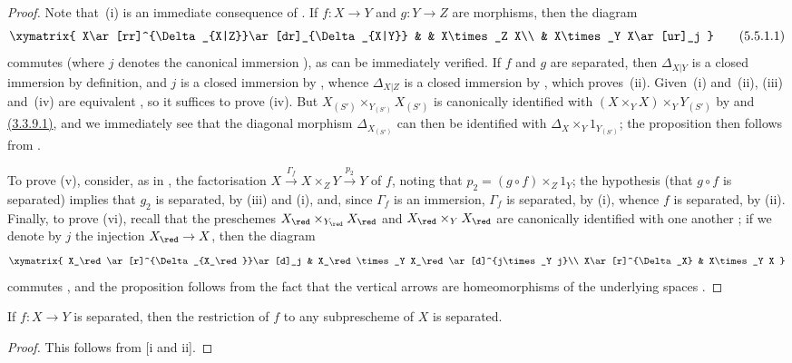 \begin{proof}
Note that~(i) is an immediate consequence of .
If $f:X\to Y$ and $g:Y\to Z$ are morphisms, then the diagram
\[
\label{I.5.5.1.1}
  \xymatrix{
    X\ar[rr]^{\Delta_{X|Z}}\ar[dr]_{\Delta_{X|Y}} & &
    X\times_Z X\\
    & X\times_Y X\ar[ur]_j
  }
  \tag{5.5.1.1}
\]
commutes (where $j$ denotes the canonical immersion ), as can be immediately verified.
If $f$ and $g$ are separated, then $\Delta_{X|Y}$ is a closed immersion by definition, and $j$ is a closed immersion by , whence $\Delta_{X|Z}$ is a closed immersion by , which
proves~(ii).
Given~(i) and~(ii), (iii) and~(iv) are equivalent , so it suffices to prove (iv).
But $X_{(S')}\times_{Y_{(S')}}X_{(S')}$ is canonically identified with $(X\times_Y X)\times_Y Y_{(S')}$ by  and \hyperref[I.3.3.9]{(3.3.9.1)}, and we immediately see that the diagonal morphism $\Delta_{X_{(S')}}$ can then be identified with $\Delta_X\times_Y 1_{Y_{(S')}}$;
the proposition then follows from .

To prove (v), consider, as in , the factorisation $X\xrightarrow{\Gamma_f}X\times_Z Y\xrightarrow{p_2}Y$ of $f$, noting that $p_2=(g\circ f)\times_Z 1_Y$;
the hypothesis (that $g\circ f$ is separated) implies that $g_2$ is separated, by (iii) and (i), and, since $\Gamma_f$ is an immersion, $\Gamma_f$ is separated, by (i), whence $f$ is separated, by (ii).
Finally, to prove (vi), recall that the preschemes $X_\red\times_{Y_\red}X_\red$ and $X_\red\times_Y X_\red$ are canonically identified with one another ;
if we denote by $j$ the injection $X_\red\to X$, then the diagram
\[
  \xymatrix{
    X_\red\ar[r]^{\Delta_{X_\red}}\ar[d]_j &
    X_\red\times_Y X_\red\ar[d]^{j\times_Y j}\\
    X\ar[r]^{\Delta_X} &
    X\times_Y X
  }
\]
commutes , and the proposition follows from the fact that the vertical arrows are homeomorphisms of the underlying spaces .
\end{proof}

\begin{corollary}[5.5.2]
\label{I.5.5.2}
If $f:X\to Y$ is separated, then the restriction of $f$ to any subprescheme of $X$ is separated.
\end{corollary}

\begin{proof}
This follows from [i and ii].
\end{proof}

